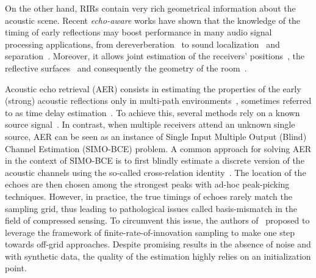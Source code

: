 On the other hand, RIRs contain very rich geometrical information about the acoustic scene.
Recent \textit{echo-aware} works have shown that the knowledge of the timing of early reflections may boost performance in many audio signal processing applications,
from dereverberation~\cite{Wu2006,Lin2008} to sound localization~\cite{Ribeiro2010,DiCarlo2019} and separation~\cite{Dokmanic2015a, Scheibler2017}.
Moreover, it allows joint estimation of the receivers' positions~\cite{Salvati2016}, the reflective surfaces~\cite{Antonacci2012} and consequently the geometry of the room~\cite{Dokmanic2013, Crocco2017}.

Acoustic echo retrieval (AER) consists in estimating the properties of the early (strong) acoustic reflections only in
multi-path environments~\cite{Tukuljac2018}, sometimes referred to as time delay estimation~\cite{Chen2006a}.
To achieve this, several methods rely on a known source signal~\cite{park2017compressive,jensen2019method}.
In contrast, when multiple receivers attend an unknown single source, AER can be seen as an instance of Single Input Multiple Output (Blind) Channel Estimation (SIMO-BCE) problem.
A common approach for solving AER in the context of SIMO-BCE is to first blindly estimate a discrete version of the acoustic channels using the so-called cross-relation identity~\cite{Xu1995, Crocco2016}.
The location of the echoes are then chosen among the strongest peaks with ad-hoc peak-picking techniques.
However, in practice, the true timings of echoes rarely match the sampling grid, thus leading to pathological issues called basis-mismatch in the field of compressed sensing.
To circumvent this issue, the authors of~\cite{Tukuljac2018} proposed to leverage the framework of finite-rate-of-innovation sampling to make one step towards off-grid approaches.
Despite promising results in the absence of noise and with synthetic data, the quality of the estimation highly relies on an initialization point.

